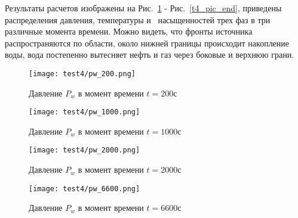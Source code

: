 Результаты расчетов изображены на Рис.~\ref{t4_pic_start} - Рис.~\ref{t4_pic_end}, приведены распределения давления, температуры
и~ насыщенностей трех фаз в три различные момента времени. Можно видеть, что фронты источника распространяются по
области, около нижней границы происходит накопление воды, вода постепенно вытесняет нефть и газ через боковые и верхнюю грани.

\begin{figure}
  \begin{center}
    \begin{minipage}[h]{0.49\textwidth}
       \texttt{[image: test4/pw\_200.png]}
       \vspace{1cm}
       \caption{Давление $P_w$ в момент времени $t=200$с}
       \label{t4_pic_start}
    \end{minipage}
    \hfill
    \begin{minipage}[h]{0.49\textwidth}
       \texttt{[image: test4/pw\_1000.png]}
       \vspace{1cm}
       \caption{Давление $P_w$ в момент времени $t=1000$с}
    \end{minipage}
    \vspace{3cm}
    \vfill
    \begin{minipage}[h]{0.49\textwidth}
       \texttt{[image: test4/pw\_2000.png]}
       \vspace{1cm}
       \caption{Давление $P_w$ в момент времени $t=2000$с}
    \end{minipage}
    \hfill
    \begin{minipage}[h]{0.49\textwidth}
       \texttt{[image: test4/pw\_6600.png]}
       \vspace{1cm}
       \caption{Давление $P_w$ в момент времени $t=6600$с}
    \end{minipage}
    \hfill  
  \end{center}
\end{figure}

